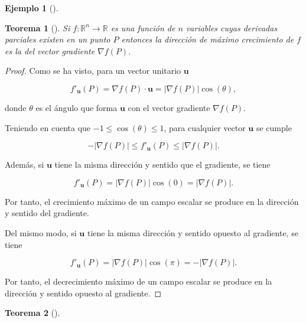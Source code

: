 \documentclass[
  a4paper,
]{scrreport}
\theoremstyle{definition}
\newtheorem{example}{Ejemplo}[chapter]
\theoremstyle{plain}
\theoremstyle{definition}
\theoremstyle{definition}
\theoremstyle{plain}
\newtheorem{theorem}{Teorema}[chapter]
\theoremstyle{plain}
\theoremstyle{remark}
\begin{document}
\begin{example}[]
\begin{theorem}[]
Si \(f:\mathbb{R}^n\rightarrow \mathbb{R}\) es una función de \(n\)
variables cuyas derivadas parciales existen en un punto \(P\) entonces
la dirección de máximo crecimiento de \(f\) es la del vector gradiente
\(\nabla f(P)\).

\end{theorem}

\begin{tcolorbox}[enhanced jigsaw, leftrule=.75mm, colbacktitle=quarto-callout-note-color!10!white, toprule=.15mm, opacityback=0, opacitybacktitle=0.6, toptitle=1mm, breakable, bottomtitle=1mm, colframe=quarto-callout-note-color-frame, rightrule=.15mm, titlerule=0mm, title=\textcolor{quarto-callout-note-color}{\faInfo}\hspace{0.5em}{Demostración}, arc=.35mm, left=2mm, bottomrule=.15mm, colback=white, coltitle=black]

\begin{proof}
Como se ha visto, para un vector unitario \(\mathbf{u}\)

\[
f'_{\mathbf{u}}(P) = \nabla f(P)\cdot \mathbf{u} = |\nabla f(P)|\cos(\theta),
\]

donde \(\theta\) es el ángulo que forma \(\mathbf{u}\) con el vector
gradiente \(\nabla f(P)\).

Teniendo en cuenta que \(-1\leq \cos(\theta)\leq 1\), para cualquier
vector \(\mathbf{u}\) se cumple

\[
-|\nabla f(P)|\leq f'_{\mathbf{u}}(P)\leq |\nabla f(P)|.
\]

Además, si \(\mathbf{u}\) tiene la misma dirección y sentido que el
gradiente, se tiene

\[
f'_{\mathbf{u}}(P)=|\nabla f(P)| \cos(0)= |\nabla f(P)|.
\]

Por tanto, el crecimiento máximo de un campo escalar se produce en la
dirección y sentido del gradiente.

Del mismo modo, si \(\mathbf{u}\) tiene la misma dirección y sentido
opuesto al gradiente, se tiene

\[
f'_{\mathbf{u}}(P)=|\nabla f(P)| \cos(\pi)=-|\nabla f(P)|.
\]

Por tanto, el decrecimiento máximo de un campo escalar se produce en la
dirección y sentido opuesto al gradiente.
\end{proof}

\end{tcolorbox}

\begin{theorem}[]\protect\hypertarget{thm-gradiente-normal-curvas-nivel}{}\label{thm-gradiente-normal-curvas-nivel}


\end{theorem}
\end{example}
\end{document}
